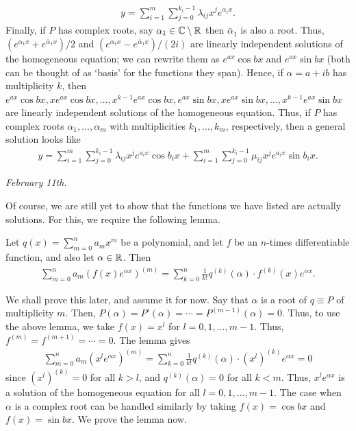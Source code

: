 \begin{align}
    y = \sum_{i=1}^{m} \sum_{j=0}^{k_{i}-1} \lambda_{ij} x^{j} e^{\alpha_{i} x}.
\end{align}
Finally, if $P$ has complex roots, say $\alpha_{1} \in \mathbb{C}\setminus\mathbb{R}$ then $\bar{\alpha}_{1}$ is also a root. Thus, $(e^{\alpha_{1}x}+e^{\bar{\alpha}_{1}x})/2$ and $(e^{\alpha_{1}x}-e^{\bar{\alpha}_{1}x})/(2i)$ are linearly independent solutions of the homogeneous equation; we can rewrite them as $e^{ax} \cos bx$ and $e^{ax} \sin bx$ (both can be thought of as `basis' for the functions they span). Hence, if $\alpha = a+ib$ has multiplicity $k$, then $e^{ax} \cos bx, x e^{ax} \cos bx, \ldots, x^{k-1} e^{ax} \cos bx, e^{ax} \sin bx, x e^{ax} \sin bx, \ldots, x^{k-1} e^{ax} \sin bx$ are linearly independent solutions of the homogeneous equation. Thus, if $P$ has complex roots $\alpha_{1},\ldots,\alpha_{m}$ with multiplicities $k_{1},\ldots,k_{m}$, respectively, then a general solution looks like
\begin{align}
    y = \sum_{i=1}^{m} \sum_{j=0}^{k_{i}-1} \lambda_{ij} x^{j} e^{a_{i} x} \cos b_{i} x + \sum_{i=1}^{m} \sum_{j=0}^{k_{i}-1} \mu_{ij} x^{j} e^{a_{i} x} \sin b_{i} x.
\end{align}

\noindent \textit{February 11th.}

Of course, we are still yet to show that the functions we have listed are actually solutions. For this, we require the following lemma.
\begin{lemma}
    Let $q(x) = \sum_{m=0}^{n} a_{m} x^{m}$ be a polynomial, and let $f$ be an $n$-times differentiable function, and also let $\alpha \in \mathbb{R}$. Then
    \begin{align}
        \sum_{m=0}^{n} a_{m} (f(x) e^{\alpha x})^{(m)} = \sum_{k=0}^{n} \frac{1}{k!} q^{(k)}(\alpha) \cdot f^{(k)}(x) e^{\alpha x}.
    \end{align}
\end{lemma}
We shall prove this later, and assume it for now. Say that $\alpha$ is a root of $q \equiv P$ of multiplicity $m$. Then, $P(\alpha) = P'(\alpha) = \cdots = P^{(m-1)}(\alpha) = 0$. Thus, to use the above lemma, we take $f(x) = x^{l}$ for $l = 0,1,\ldots,m-1$. Thus, $f^{(m)} = f^{(m+1)} = \cdots = 0$. The lemma gives
\begin{align}
    \sum_{m=0}^{n} a_{m} (x^{l} e^{\alpha x})^{(m)} = \sum_{k=0}^{n} \frac{1}{k!} q^{(k)}(\alpha) \cdot (x^{l})^{(k)} e^{\alpha x} = 0
\end{align}
since $(x^{l})^{(k)} = 0$ for all $k > l$, and $q^{(k)}(\alpha) = 0$ for all $k < m$. Thus, $x^{l} e^{\alpha x}$ is a solution of the homogeneous equation for all $l = 0,1,\ldots,m-1$. The case when $\alpha$ is a complex root can be handled similarly by taking $f(x) = \cos bx$ and $f(x) = \sin bx$. We prove the lemma now.

